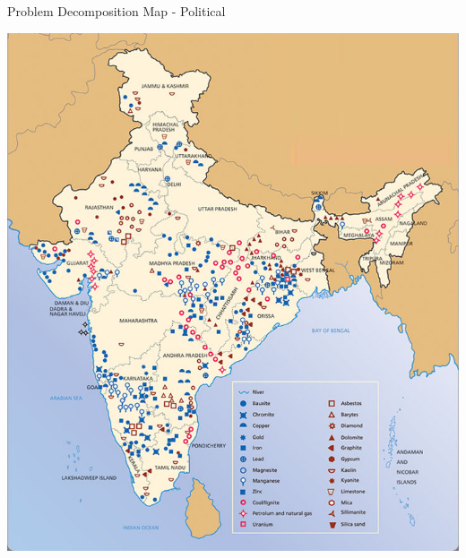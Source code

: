 \documentclass{beamer}
\begin{document}
\begin{frame}[fragile]{Problem Decomposition}
{Map - Political}

\begin{center}
\includegraphics[height=0.75\textheight]{images/india-map-mineral.jpg}
\end{center}
\end{frame}
\end{document}

